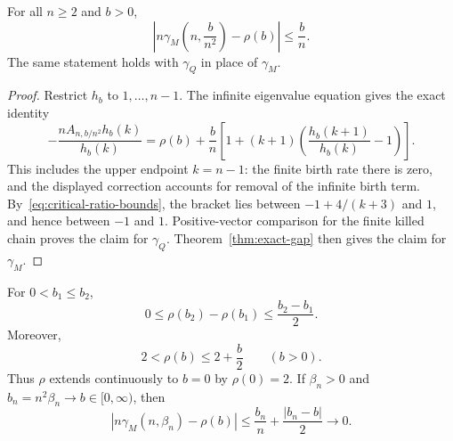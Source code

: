 \begin{theorem}
\label{thm:critical-limit}
For all $n\geq2$ and $b>0$,
\begin{equation}\label{eq:critical-finite-error}
 \left|n\gamma_M\left(n,\frac b{n^2}\right)-\rho(b)\right|
 \leq\frac bn.
\end{equation}
The same statement holds with $\gamma_Q$ in place of $\gamma_M$.
\end{theorem}

\begin{proof}
Restrict $h_b$ to $1,\ldots,n-1$.  The infinite eigenvalue equation
gives the exact identity
\begin{equation}\label{eq:critical-finite-quotient}
 -\frac{nA_{n,b/n^2}h_b(k)}{h_b(k)}
 =\rho(b)+\frac bn
   \left[1+(k+1)\left(\frac{h_b(k+1)}{h_b(k)}-1\right)\right].
\end{equation}
This includes the upper endpoint $k=n-1$: the finite birth rate there
is zero, and the displayed correction accounts for removal of the
infinite birth term.  By~\eqref{eq:critical-ratio-bounds}, the bracket
lies between $-1+4/(k+3)$ and $1$, and hence between $-1$ and $1$.
Positive-vector comparison for the finite killed chain proves the
claim for $\gamma_Q$.  Theorem~\ref{thm:exact-gap} then gives the claim
for $\gamma_M$.
\end{proof}

\begin{proposition}
\label{prop:critical-lipschitz}
For $0<b_1\leq b_2$,
\begin{equation}\label{eq:critical-lipschitz}
 0\leq\rho(b_2)-\rho(b_1)\leq\frac{b_2-b_1}{2}.
\end{equation}
Moreover,
\begin{equation}\label{eq:critical-elementary-bounds}
 2<\rho(b)\leq2+\frac b2\qquad(b>0).
\end{equation}
Thus $\rho$ extends continuously to $b=0$ by $\rho(0)=2$.  If
$\beta_n>0$ and $b_n=n^2\beta_n\longrightarrow b\in[0,\infty)$, then
\begin{equation}\label{eq:critical-moving-parameter}
 \left|n\gamma_M(n,\beta_n)-\rho(b)\right|
 \leq\frac{b_n}{n}+\frac{|b_n-b|}{2}\longrightarrow0.
\end{equation}
\end{proposition}

